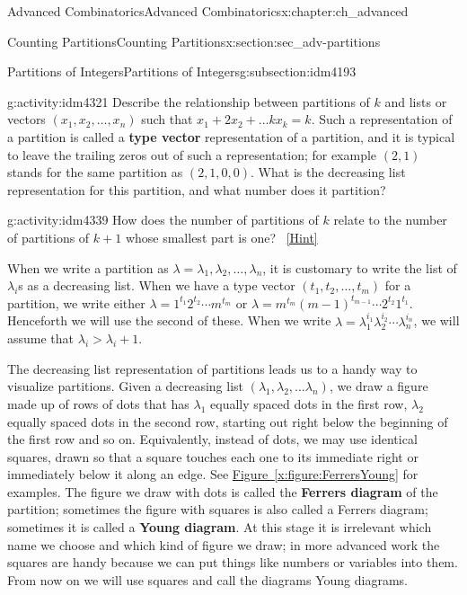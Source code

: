 \documentclass[oneside,10pt,]{book}
\newcommand{\terminology}[1]{\textbf{#1}}
\numberwithin{equation}{chapter}
\begin{document}
\begin{chapterptx}{Advanced Combinatorics}{}{Advanced Combinatorics}{}{}{x:chapter:ch_advanced}
\begin{sectionptx}{Counting Partitions}{}{Counting Partitions}{}{}{x:section:sec_adv-partitions}
\begin{subsectionptx}{Partitions of Integers}{}{Partitions of Integers}{}{}{g:subsection:idm4193}
\begin{activity}{}{g:activity:idm4321}%
Describe the relationship between partitions of \(k\) and lists or vectors \((x_1,x_2,\ldots,x_n)\) such that \(x_1+2x_2+\ldots kx_k = k\).  Such a representation of a partition is called a \terminology{type vector} representation of a partition, and it is typical to leave the trailing zeros out of such a representation; for example \((2,1)\) stands for the same partition as \((2,1,0,0)\). What is the decreasing list representation for this partition, and what number does it partition?%
\end{activity}
\begin{activity}{}{g:activity:idm4339}%
How does the number of partitions of \(k\) relate to the number of partitions of \(k+1\) whose smallest part is one?%
\qquad~\hfill{\tiny\hyperlink{g:hint:idm4344-back}{[Hint]}}\end{activity}
When we write a partition as \(\lambda = \lambda_1,\lambda_2,\ldots,\lambda_n\), it is customary to write the list of \(\lambda_i\)s as a decreasing list. When we have a type vector \((t_1,t_2,\ldots,t_m)\) for a partition, we write either \(\lambda = 1^{t_1}2^{t_2}\cdots m^{t_m}\) or \(\lambda = m^{t_m}(m-1)^{t_{m-1}}\cdots 2^{t_2}1^{t_1}\). Henceforth we will use the second of these. When we write \(\lambda=\lambda_1^{i_1}\lambda_2^{i_2}\cdots\lambda_n^{i_n}\), we will assume that \(\lambda_i>\lambda_i+1\).%
\par
The decreasing list representation of partitions leads us to a handy way to visualize partitions. Given a decreasing list \((\lambda_1,\lambda_2,\ldots \lambda_n)\), we draw a figure made up of rows of dots that has \(\lambda_1\) equally spaced dots in the first row, \(\lambda_2\) equally spaced dots in the second row, starting out right below the beginning of the first row and so on. Equivalently, instead of dots, we may use identical squares, drawn so that a square touches each one to its immediate right or immediately below it along an edge. See \hyperref[x:figure:FerrersYoung]{Figure~\ref{x:figure:FerrersYoung}} for examples. The figure we draw with dots is called the \terminology{Ferrers diagram} of the partition; sometimes the figure with squares is also called a Ferrers diagram; sometimes it is called a \terminology{Young diagram}. At this stage it is irrelevant which name we choose and which kind of figure we draw; in more advanced work the squares are handy because we can put things like numbers or variables into them.  From now on we will use squares and call the diagrams Young diagrams.%

\end{subsectionptx}
\end{sectionptx}
\end{chapterptx}
\end{document}
